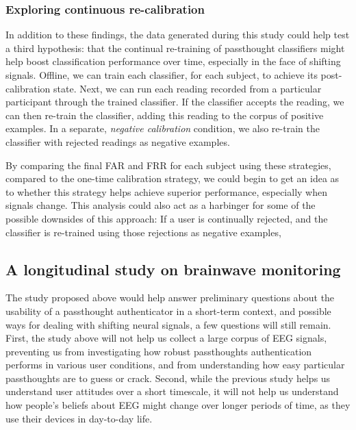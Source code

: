 \documentclass[sigconf]{acmart}
\begin{document}
\subsubsection{Exploring continuous re-calibration}
\label{sec:org236c4c5}

In addition to these findings, the data generated during this study could help test 
a third hypothesis: that the continual re-training of passthought classifiers might help boost classification performance over time,
especially in the face of shifting signals.
Offline, we can train each classifier, for each subject, to achieve its post-calibration state.
Next, we can run each reading recorded from a particular participant through the trained classifier.
If the classifier accepts the reading, we can then re-train the classifier, 
adding this reading to the corpus of positive examples.
In a separate, \emph{negative calibration} condition, 
we also re-train the classifier with rejected readings as negative examples.

By comparing the final FAR and FRR for each subject using these strategies, 
compared to the one-time calibration strategy, we could begin to get an idea as to whether
this strategy helps achieve superior performance, especially when signals change.
This analysis could also act as a harbinger for some of the possible downsides of this approach:
If a user is continually rejected, and the classifier is re-trained using those rejections as negative examples,

\subsection{A longitudinal study on brainwave monitoring}
\label{sec:orgdb1427a}

The study proposed above would help answer preliminary questions about
the usability of a passthought authenticator in a short-term context,
and possible ways for dealing with shifting neural signals,
a few questions will still remain.
First, the study above will not help us collect a large corpus of EEG signals, 
preventing us from investigating how robust passthoughts authentication performs in various user conditions,
and from understanding how easy particular passthoughts are to guess or crack.
Second, while the previous study helps us understand user attitudes over a short timescale,
it will not help us understand how people's beliefs about EEG might change over longer periods of time, as they use their devices in day-to-day life.
\end{document}
